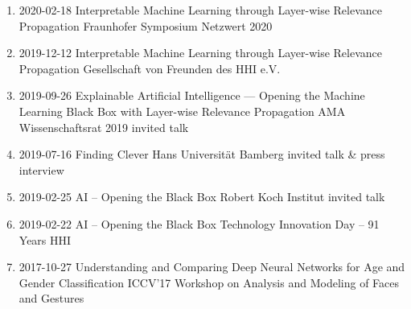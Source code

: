 \documentclass[10pt,a4paper]{article} %
\begin{document}
{\begin{enumerate}
                    {2020-07-02}
                    {XAI via LRP and SpRAy}
                    {Ada Day at Ada Lovelace Center / Fraunhofer IIS}
                    {invited talk}
    \item {}
                    {2020-02-18}
                    {Interpretable Machine Learning through Layer-wise Relevance Propagation}
                    {Fraunhofer Symposium Netzwert 2020}
    \item {}
                    {2019-12-12}
                    {Interpretable Machine Learning through Layer-wise Relevance Propagation}
                    {Gesellschaft von Freunden des HHI e.V.}
    \item {}
                    {2019-09-26}
                    {Explainable Artificial Intelligence --- Opening the Machine Learning Black Box with Layer-wise Relevance Propagation}
                    {AMA Wissenschaftsrat 2019}
                    {invited talk}
    \item {}
                    {2019-07-16}
                    {Finding Clever Hans}
                    {Universität Bamberg}
                    {invited talk \& press interview}
    \item {}
                    {2019-02-25}
                    {AI -- Opening the Black Box}
                    {Robert Koch Institut}
                    {invited talk}
    \item {}
                    {2019-02-22}
                    {AI -- Opening the Black Box}
                    {Technology Innovation Day -- 91 Years HHI}
    \item {}
                    {2017-10-27}
                    {Understanding and Comparing Deep Neural Networks for Age and Gender Classification}
                    {ICCV'17 Workshop on Analysis and Modeling of Faces and Gestures}
\end{enumerate}
}
\end{document}
